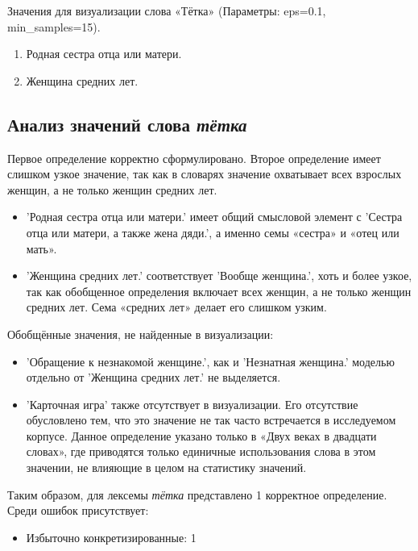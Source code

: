 Значения для визуализации слова «Тётка» (Параметры: eps=0.1, min\_samples=15).

\begin{enumerate}
    \item Родная сестра отца или матери.
    \item Женщина средних лет.
\end{enumerate}

\subsection*{Анализ значений слова \textit{тётка}}

Первое определение корректно сформулировано.
Второе определение имеет слишком узкое значение, так как в словарях значение охватывает всех взрослых женщин,
а не только женщин средних лет.

\begin{itemize}
    \item ’Родная сестра отца или матери.’ имеет общий смысловой элемент с
’Сестра отца или матери, а также жена дяди.’, а именно семы «сестра» и «отец или мать».

    \item ’Женщина средних лет.’ соответствует ’Вообще женщина.’, хоть и более узкое,
так как обобщенное определения включает всех женщин, а не только женщин средних лет.
Сема «средних лет» делает его слишком узким.
\end{itemize}

Обобщённые значения, не найденные в визуализации:
\begin{itemize}
    \item ’Обращение к незнакомой женщине.’, как и ’Незнатная женщина.’ моделью отдельно от
’Женщина средних лет.’ не выделяется.

    \item ’Карточная игра’ также отсутствует в визуализации.
Его отсутствие обусловлено тем, что это значение не так часто встречается в исследуемом корпусе.
Данное определение указано только в «Двух веках в двадцати словах», где приводятся только
единичные использования слова в этом значении, не влияющие в целом на статистику значений.
\end{itemize}

Таким образом, для лексемы \textit{тётка} представлено 1 корректное определение.
Среди ошибок присутствует:
\begin{itemize}
    \item Избыточно конкретизированные: 1
\end{itemize}

